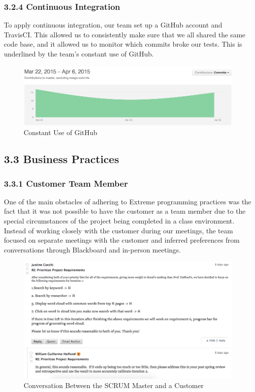 \documentclass[]{article}
\begin{document}
\subsubsection{3.2.4 Continuous
Integration}\label{continuous-integration}

To apply continuous integration, our team set up a GitHub account and
TravisCI. This allowed us to consistently make sure that we all shared
the same code base, and it allowed us to monitor which commits broke our
tests. This is underlined by the team's constant use of GitHub.


\begin{figure}[htbp]
\centering
\includegraphics{steady_pace.png}
\caption{Constant Use of GitHub}
\end{figure}

\subsection{3.3 Business Practices}\label{business-practices}

\subsubsection{3.3.1 Customer Team Member}\label{customer-team-member}

One of the main obstacles of adhering to Extreme programming practices
was the fact that it was not possible to have the customer as a team
member due to the special circumstances of the project being completed
in a class environment. Instead of working closely with the customer
during our meetings, the team focused on separate meetings with the
customer and inferred preferences from conversations through Blackboard
and in-person meetings.


\begin{figure}[htbp]
\centering
\includegraphics{sm_conv.png}
\caption{Conversation Between the SCRUM Master and a Customer}
\end{figure}
\end{document}
